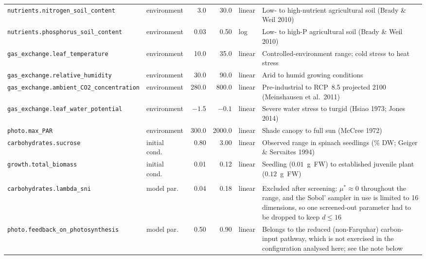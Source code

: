 \documentclass[a4paper,fleqn]{cas-sc}
\begin{document}
\begin{table}[!htbp]
\begin{tabular}{@{}@{}>{\raggedright\arraybackslash}p{}lrrl>{\raggedright\arraybackslash}p{}@{}}
\texttt{nutrients.\allowbreak nitrogen\_\allowbreak soil\_\allowbreak content}    & environment & 3.0    & 30.0   & linear & Low- to high-nutrient agricultural soil (Brady \& Weil 2010) \\
\texttt{nutrients.\allowbreak phosphorus\_\allowbreak soil\_\allowbreak content}  & environment & 0.03   & 0.50   & log    & Low- to high-P agricultural soil (Brady \& Weil 2010) \\
\texttt{gas\_\allowbreak exchange.\allowbreak leaf\_\allowbreak temperature}      & environment & 10.0   & 35.0   & linear & Controlled-environment range; cold stress to heat stress \\
\texttt{gas\_\allowbreak exchange.\allowbreak relative\_\allowbreak humidity}     & environment & 30.0   & 90.0   & linear & Arid to humid growing conditions \\
\texttt{gas\_\allowbreak exchange.\allowbreak ambient\_\allowbreak CO2\_\allowbreak concentration} & environment & 280.0 & 800.0 & linear & Pre-industrial to RCP~8.5 projected 2100 (Meinshausen et al.\ 2011) \\
\texttt{gas\_\allowbreak exchange.\allowbreak leaf\_\allowbreak water\_\allowbreak potential} & environment & $-1.5$ & $-0.1$ & linear & Severe water stress to turgid (Hsiao 1973; Jones 2014) \\
\texttt{photo.\allowbreak max\_\allowbreak PAR}                       & environment & 300.0  & 2000.0 & linear & Shade canopy to full sun (McCree 1972) \\
\texttt{carbohydrates.\allowbreak sucrose}                & initial cond.\ & 0.80 & 3.00  & linear & Observed range in spinach seedlings (\% DW; Geiger \& Servaites 1994) \\
\texttt{growth.\allowbreak total\_\allowbreak biomass}                & initial cond.\ & 0.01 & 0.12  & linear & Seedling ($0.01$~g~FW) to established juvenile plant ($0.12$~g~FW) \\
\midrule
\multicolumn{6}{@{}l}{\emph{Disabled: excluded from the design, with reason}}\\
\texttt{carbohydrates.\allowbreak lambda\_\allowbreak sni}            & model par.\ & 0.04   & 0.18   & linear & Excluded after screening: $\mu^{\ast}\approx0$ throughout the range, and the Sobol' sampler in use is limited to 16 dimensions, so one screened-out parameter had to be dropped to keep $d\le16$ \\
\texttt{photo.\allowbreak feedback\_\allowbreak on\_\allowbreak photosynthesis}   & model par.\ & 0.50   & 0.90   & linear & Belongs to the reduced (non-Farquhar) carbon-input pathway, which is not exercised in the configuration analysed here; see the note below \\

\end{tabular}
\end{table}
\end{document}
